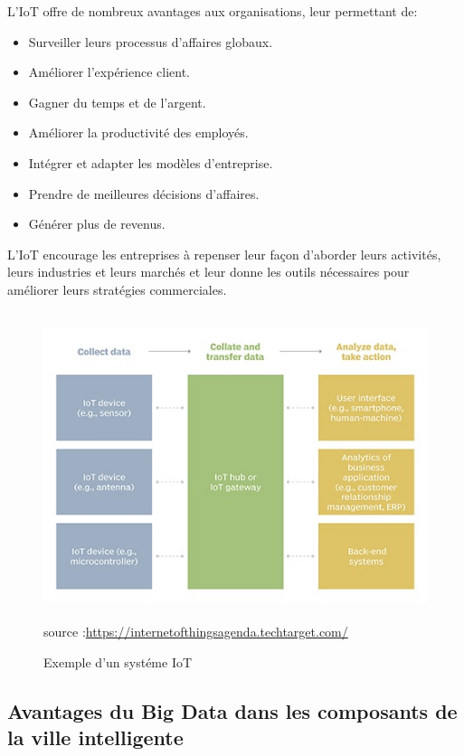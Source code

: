 \documentclass[french, a4paper, 12pt]{report}
\begin{document}
L'IoT offre de nombreux avantages aux organisations, leur permettant de:
\begin{itemize}
\item \textbf{}Surveiller leurs processus d'affaires globaux. 
\item \textbf{}Améliorer l'expérience client.
\item \textbf{}Gagner du temps et de l'argent. 
\item \textbf{}Améliorer la productivité des employés. 
\item \textbf{}Intégrer et adapter les modèles d'entreprise. 
\item \textbf{}Prendre de meilleures décisions d'affaires. 
\item \textbf{}Générer plus de revenus.
\end{itemize}
L'IoT encourage les entreprises à repenser leur façon d'aborder leurs activités, leurs industries et leurs marchés et leur donne les outils nécessaires pour améliorer leurs stratégies commerciales.
\begin{figure}[!ht]
    \centering
    \includegraphics[height=9cm]{images/iot_system.jpg}
    \scriptsize{source :\url{https://internetofthingsagenda.techtarget.com/}}
    \caption{Exemple d'un systéme IoT}
    \label{fig:2.2}
\end{figure}
\subsection{Avantages du Big Data dans les composants de la ville intelligente}
\end{document}
